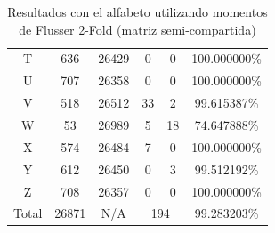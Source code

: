 \documentclass[a4paper, 11pt, oneside]{report}
\begin{document}
\begin{table}
\begin{tabular}{|c|c|c|c|c|c|}
	T & 636 & 26429 & 0 & 0 & 100.000000\% \\ 
	U & 707 & 26358 & 0 & 0 & 100.000000\% \\ 
	V & 518 & 26512 & 33 & 2 & 99.615387\% \\ 
	W & 53 & 26989 & 5 & 18 & 74.647888\% \\ 
	X & 574 & 26484 & 7 & 0 & 100.000000\% \\ 
	Y & 612 & 26450 & 0 & 3 & 99.512192\% \\ 
	Z & 708 & 26357 & 0 & 0 & 100.000000\% \\ 
	\hline
	Total & 26871 & N/A & \multicolumn{2}{|c|}{194} & 99.283203\% \\
	\hline
\end{tabular}
\caption{Resultados con el alfabeto utilizando momentos de Flusser 2-Fold (matriz semi-compartida)}
\label{tb:alphaRotShared}
\end{table}
\end{document}
